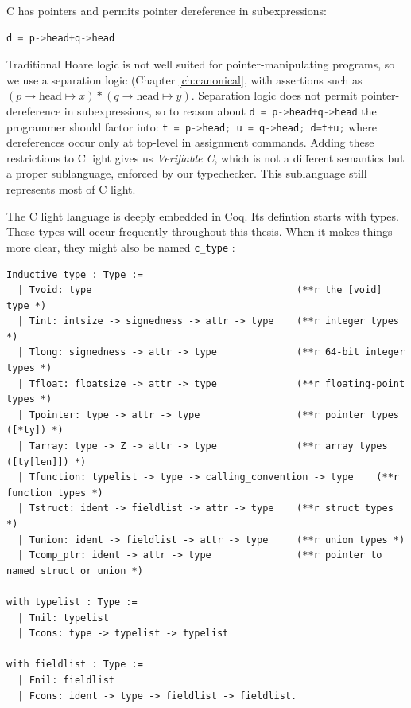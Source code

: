 \documentclass{puthesis}
\begin{document}
C has pointers and permits pointer dereference in subexpressions: 
\begin{lstlisting}[language=C]
d = p->head+q->head
\end{lstlisting}

Traditional Hoare logic is not well suited for pointer-manipulating programs,
so we use a separation logic (Chapter \ref{ch:canonical}, with assertions such as 
$(p\!\!\rightarrow \! \! \mathrm{head} \mapsto x) *(q \!\! \rightarrow \! \!
\mathrm{head} \mapsto y)$. Separation logic does not permit pointer-dereference
in subexpressions, so to reason about 
\lstinline[language=C]|d = p->head+q->head| 
the programmer should factor into:
\lstinline[language=c]|t = p->head; u = q->head; d=t+u;|
where dereferences occur only at top-level in assignment commands.
Adding these restrictions to C light gives us \emph{Verifiable C}, which is not
a different semantics but a proper sublanguage, enforced by our
typechecker. This sublanguage still represents most of C light.

The C light language is deeply embedded in Coq. Its defintion starts
with types. These types will occur frequently throughout this
thesis. When it makes things more clear, they might also be named
\lstinline|c_type| :

\begin{lstlisting}
Inductive type : Type :=
  | Tvoid: type                                    (**r the [void] type *)
  | Tint: intsize -> signedness -> attr -> type    (**r integer types *)
  | Tlong: signedness -> attr -> type              (**r 64-bit integer types *)
  | Tfloat: floatsize -> attr -> type              (**r floating-point types *)
  | Tpointer: type -> attr -> type                 (**r pointer types ([*ty]) *)
  | Tarray: type -> Z -> attr -> type              (**r array types ([ty[len]]) *)
  | Tfunction: typelist -> type -> calling_convention -> type    (**r function types *)
  | Tstruct: ident -> fieldlist -> attr -> type    (**r struct types *)
  | Tunion: ident -> fieldlist -> attr -> type     (**r union types *)
  | Tcomp_ptr: ident -> attr -> type               (**r pointer to named struct or union *)

with typelist : Type :=
  | Tnil: typelist
  | Tcons: type -> typelist -> typelist

with fieldlist : Type :=
  | Fnil: fieldlist
  | Fcons: ident -> type -> fieldlist -> fieldlist.
\end{lstlisting}
\end{document}
